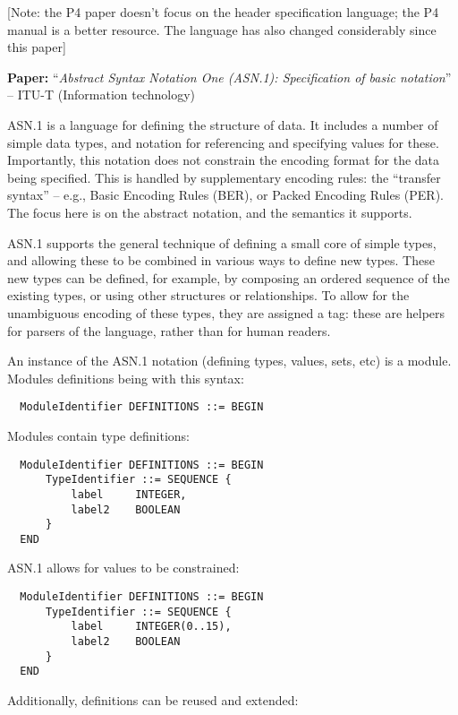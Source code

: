 \documentclass[10pt]{article}
\newcommand{\paper}[3]{\vspace{4mm}\noindent\textbf{Paper:} ``\textit{#1}'' -- #2 \cite{#3}\vspace{3mm}}
\begin{document}
[Note: the P4 paper doesn't focus on the header specification language; the P4 manual is
a better resource. The language has also changed considerably since this paper]

\paper{Abstract Syntax Notation One (ASN.1): Specification of basic notation}{ITU-T (Information technology)}{x680}

ASN.1 is a language for defining the structure of data. It includes a number of simple
data types, and notation for referencing and specifying values for these. Importantly,
this notation does not constrain the encoding format for the data being specified. This
is handled by supplementary encoding rules: the ``transfer syntax'' -- e.g., Basic
Encoding Rules (BER), or Packed Encoding Rules (PER). The focus here is on the abstract
notation, and the semantics it supports.

ASN.1 supports the general technique of defining a small core of simple types, and
allowing these to be combined in various ways to define new types. These new types can
be defined, for example, by composing an ordered sequence of the existing types, or using
other structures or relationships. To allow for the unambiguous encoding of these types,
they are assigned a tag: these are helpers for parsers of the language, rather than for
human readers.

An instance of the ASN.1 notation (defining types, values, sets, etc) is a
module. Modules definitions being with this syntax:

\begin{verbatim}
  ModuleIdentifier DEFINITIONS ::= BEGIN
\end{verbatim}

Modules contain type definitions:

\begin{verbatim}
  ModuleIdentifier DEFINITIONS ::= BEGIN
      TypeIdentifier ::= SEQUENCE {
          label     INTEGER,
          label2    BOOLEAN
      }
  END
\end{verbatim}

ASN.1 allows for values to be constrained:

\begin{verbatim}
  ModuleIdentifier DEFINITIONS ::= BEGIN
      TypeIdentifier ::= SEQUENCE {
          label     INTEGER(0..15),
          label2    BOOLEAN
      }
  END  
\end{verbatim}

Additionally, definitions can be reused and extended:
\end{document}
